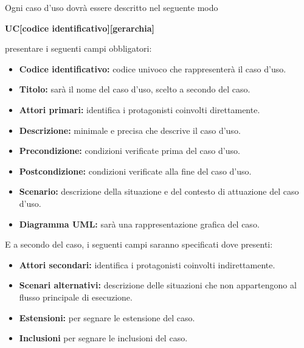 \documentclass[a4paper,11pt]{article}
\begin{document}
			Ogni caso d'uso dovrà essere descritto nel seguente modo
			\begin{center}
						\textbf{ UC[codice identificativo][gerarchia]}		
					
			\end{center}
			 presentare i seguenti campi obbligatori:
			\begin{itemize}
			\item \textbf{Codice identificativo:} codice univoco che rappresenterà il caso d'uso. 
			\item \textbf{Titolo:} sarà il nome del caso d'uso, scelto a secondo del caso.
			\item \textbf{Attori primari:} identifica i protagonisti coinvolti direttamente.
			\item \textbf{Descrizione:} minimale e precisa che descrive il caso d'uso.
			\item \textbf{Precondizione:} condizioni verificate prima del caso d'uso.
			\item \textbf{Postcondizione:} condizioni verificate alla fine del caso d'uso.
			\item \textbf{Scenario:} descrizione della situazione e del contesto di attuazione del caso d'uso.
			\item \textbf{Diagramma UML\addglos :} sarà una rappresentazione grafica del caso.
			\end{itemize}
			E a secondo del caso, i seguenti campi saranno specificati dove presenti:
			\begin{itemize}
			\item \textbf{Attori secondari:} identifica i protagonisti coinvolti indirettamente.
			\item \textbf{Scenari alternativi:} descrizione delle situazioni che non appartengono al flusso principale di esecuzione.
			\item \textbf{Estensioni:} per segnare le estensione del caso. 
			\item \textbf{Inclusioni}  per segnare le inclusioni del caso.
			\end{itemize}
							
\end{document}

